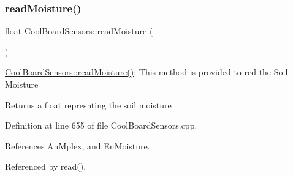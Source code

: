 \mbox{\label{classCoolBoardSensors_a8761bff50373c485f4465c8db47d0633}} 
\subsubsection{\texorpdfstring{read\+Moisture()}{readMoisture()}}
{\footnotesize\ttfamily float Cool\+Board\+Sensors\+::read\+Moisture (\begin{DoxyParamCaption}{ }\end{DoxyParamCaption})}

\hyperlink{classCoolBoardSensors_a8761bff50373c485f4465c8db47d0633}{Cool\+Board\+Sensors\+::read\+Moisture()}\+: This method is provided to red the Soil Moisture

\begin{DoxyReturn}{Returns}
a float represnting the soil moisture 
\end{DoxyReturn}


Definition at line 655 of file Cool\+Board\+Sensors.\+cpp.



References An\+Mplex, and En\+Moisture.



Referenced by read().


